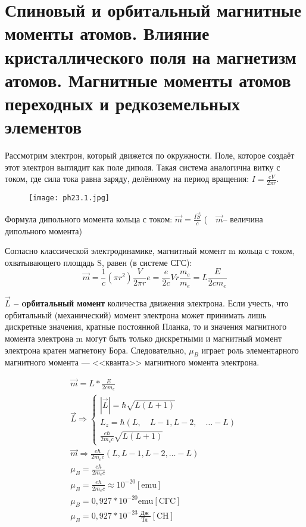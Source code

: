 
\section{Спиновый и орбитальный магнитные моменты атомов. Влияние кристаллического поля на магнетизм атомов. Магнитные моменты атомов переходных и редкоземельных элементов}


Рассмотрим электрон, который движется по окружности.
Поле, которое создаёт этот электрон выглядит как поле диполя. Такая система аналогична витку с током, где сила тока равна заряду, делённому на период вращения: $I =\frac{eV}{2\pi r}$.

\begin{figure}[h!]
    \centering
    \texttt{[image: ph23.1.jpg]}
\end{figure}

Формула дипольного момента кольца с током: 
$\vec{m}=\frac{I \vec{S}}{c}$
($\quad\vec{m}$-- величина дипольного момента)


Согласно классической электродинамике, магнитный момент m кольца с током, охватывающего площадь S, равен (в системе СГС): 
$$
\vec{m}=\frac{1}{c}\left(\pi  r^2\right)  \frac{V}{2 \pi r} e=\frac{e}{2 c} V r  \frac{m_e}{m_e}=L  \frac{E}{2 c m_e}
$$

\textbf{$\Vec{L}$ – oрбитальный момент} количества движения электрона. Если учесть, что орбитальный (механический) момент электрона может принимать лишь дискретные значения, кратные постоянной Планка, то и значения магнитного момента электрона m могут быть только дискретными и магнитный момент электрона кратен магнетону Бора. Следовательно, $\mu_B$ играет роль элементарного магнитного момента --- <<кванта>> магнитного момента электрона.

$$
\begin{gathered}
\vec{m}=L * \frac{E}{2 c m_e} \\
\vec{L} \Longrightarrow\left\{\begin{array}{c}
|\vec{L}|=\hbar \sqrt{L(L+1)} \\
L_z=\hbar(L, \quad L-1, L-2, \quad \ldots-L) \\
\frac{e \hbar}{2 m_e c} \sqrt{L(L+1)}
\end{array}\right. \\
\vec{m} \Longrightarrow \frac{e \hbar}{2 m_e c}(L, L-1, L-2, \ldots-L) \\
\mu_B=\frac{e \hbar}{2 m_e c} \\
\mu_B=\frac{e \hbar}{2 m_e c} \approx 10^{-20}[\mathrm{emu}] \\
\mu_B=0,927 * 10^{-20} \mathrm{emu}[\mathrm{CГC}] \\
\mu_B=0,927 * 10^{-23} \frac{\text { Дж }}{\text { Тл }}[\mathrm{CH}]
\end{gathered}
$$


